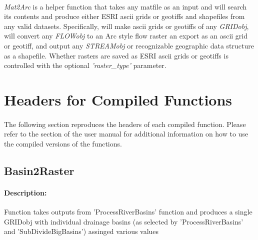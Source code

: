 \paragraph{}\textit{Mat2Arc} is a helper function that takes any matfile as an input and will search its contents and produce either ESRI ascii grids or geotiffs and shapefiles from any valid datasets. Specifically, will make ascii grids or geotiffs of any \textit{GRIDobj}, will convert any \textit{FLOWobj} to an Arc style flow raster an export as an ascii grid or geotiff, and output any \textit{STREAMobj} or recognizable geographic data structure as a shapefile. Whether rasters are saved as ESRI ascii grids or geotiffs is controlled with the optional \textit{'raster\_type'} parameter.



\appendix

\section{Headers for Compiled Functions}\label{sec:CmpFuncCalls}
\paragraph{} The following section reproduces the headers of each compiled function. Please refer to the  section of the user manual for additional information on how to use the compiled versions of the functions.

\subsection{Basin2Raster}
\paragraph{Description:}
Function takes outputs from 'ProcessRiverBasins' function and produces a single GRIDobj with individual drainage
basins (as selected by 'ProcessRiverBasins' and 'SubDivideBigBasins') assinged various values

